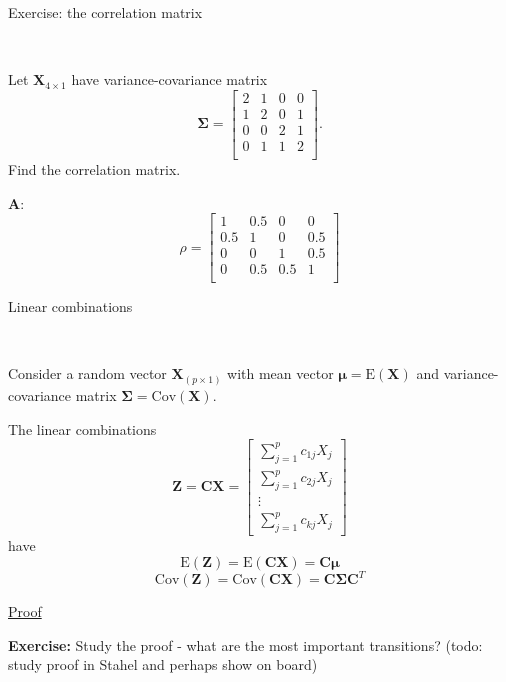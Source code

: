 \documentclass[ignorenonframetext,]{beamer}
\begin{document}
\begin{frame}

\begin{block}{Exercise: the correlation matrix}

\(~\)

Let \(\mathbf{X}_{4\times 1}\) have variance-covariance matrix
\[\mathbf\Sigma= \left[ \begin{array}{cccc} 2&1&0&0\\
      1&2&0&1\\
      0&0&2&1\\
      0&1&1&2\\
          \end{array}
          \right].\] Find the correlation matrix.

\end{block}

\end{frame}

\begin{frame}

\textbf{A}: \[\rho=\left[ \begin{array}{cccc} 1&0.5&0&0\\
      0.5&1&0&0.5\\
      0&0&1&0.5\\
      0&0.5&0.5&1\\
          \end{array}
          \right]\]

\end{frame}

\begin{frame}

\begin{block}{Linear combinations}

\(~\)

Consider a random vector \(\mathbf{X}_{(p\times 1)}\) with mean vector
\(\mathbf{\mu}=\text{E}(\mathbf{X})\) and variance-covariance matrix
\(\mathbf\Sigma=\text{Cov}(\mathbf{X})\).

The linear combinations
\[\mathbf{Z}=\mathbf{C}\mathbf{X}=\left[ \begin{array}{c} \sum_{j=1}^p c_{1j}X_j\\ \sum_{j=1}^p c_{2j}X_j\\ \vdots \\ \sum_{j=1}^p c_{kj}X_j \end{array} \right]\]
have
\[\text{E}(\mathbf{Z})=\text{E}(\mathbf{C}\mathbf{X})=\mathbf{C}\mathbf{\mu}\]
\[\text{Cov}(\mathbf{Z})=\text{Cov}(\mathbf{C}\mathbf{X})=
   \mathbf{C}\mathbf\Sigma\mathbf{C}^T\]

\href{https://www.math.ntnu.no/emner/TMA4268/2018v/notes/CXproof.pdf}{Proof}

\textbf{Exercise:} Study the proof - what are the most important
transitions? (todo: study proof in Stahel and perhaps show on board)

\end{block}

\end{frame}
\end{document}
